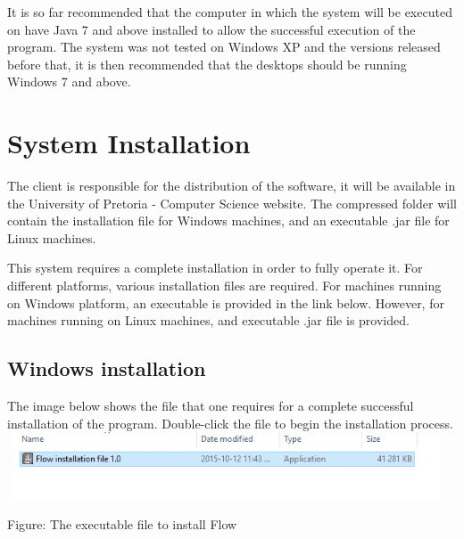 \documentclass[11pt,a4paper,titlepage]{article}
\begin{document}
		It is so far recommended that the computer in which the system will be executed on have Java 7 and above installed to allow the successful execution of the program. The system was not tested on Windows XP and the versions released before that, it is then recommended that the desktops should be running Windows 7 and above.\newline		
		
\section{System Installation}

		The client is responsible for the distribution of the software, it will be available in the University of Pretoria - Computer Science website. The compressed folder will contain the installation file for Windows machines, and an executable .jar file for Linux machines. \newline
		
		This system requires a complete installation in order to fully operate it. For different platforms, various installation files are required. \newline \newline
		For machines running on Windows platform, an executable is provided in the link below. However, for machines running on Linux machines, and executable .jar file is provided.\newline
		
		

		\subsection{Windows installation}
		
		The image below shows the file that one requires for a complete successful installation of the program. Double-click the file to begin the installation process. \newline \newline \newline
		\includegraphics[width=13cm, height=2cm]{images/Install1.jpg}		
		\begin{center}
		Figure: The executable file to install Flow \newline
		\end{center}
			
\end{document}
